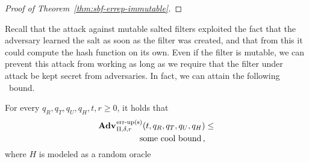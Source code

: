\begin{proof}[Proof of Theorem~\ref{thm:sbf-errep-immutable}]
  
\end{proof}


Recall that the attack against mutable salted filters exploited the fact that
the adversary learned the salt as soon as the filter was created, and that from
this it could compute the hash function on its own. Even if the filter is
mutable, we can prevent this attack from working as long as we require that the
filter under attack be kept secret from adversaries. In fact, we can attain the
following \erreps\ bound.

\begin{theorem}\label{thm:sbf-erreps}
  For every $q_R, q_T, q_U, q_H, t, r\geq 0$, it holds that
  \begin{eqnarray*}
    \begin{aligned}
      \Adv{\erreps}_{\Pi,\delta,r}(t,q_R, q_T, q_U, q_H) &\leq \\
          \text{some cool bound} \,,
    \end{aligned}
\end{eqnarray*}
where $H$ is modeled as a random oracle
\end{theorem}

